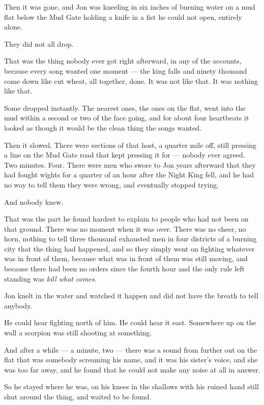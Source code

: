 Then it was gone, and Jon was kneeling in six inches of burning water on a mud flat below the Mud Gate holding a knife in a fist he could not open, entirely alone.

\sceneBreak

They did not all drop.

That was the thing nobody ever got right afterward, in any of the accounts, because every song wanted one moment — the king falls and ninety thousand come down like cut wheat, all together, done. It was not like that. It was nothing like that.

Some dropped instantly. The nearest ones, the ones on the flat, went into the mud within a second or two of the face going, and for about four heartbeats it looked as though it would be the clean thing the songs wanted.

Then it slowed. There were sections of that host, a quarter mile off, still pressing a line on the Mud Gate road that kept pressing it for — nobody ever agreed. Two minutes. Four. There were men who swore to Jon years afterward that they had fought wights for a quarter of an hour after the Night King fell, and he had no way to tell them they were wrong, and eventually stopped trying.

And nobody knew.

That was the part he found hardest to explain to people who had not been on that ground. There was no moment when it was over. There was no cheer, no horn, nothing to tell three thousand exhausted men in four districts of a burning city that the thing had happened, and so they simply went on fighting whatever was in front of them, because what was in front of them was still moving, and because there had been no orders since the fourth hour and the only rule left standing was \textit{kill what comes}.

Jon knelt in the water and watched it happen and did not have the breath to tell anybody.

He could hear fighting north of him. He could hear it east. Somewhere up on the wall a scorpion was still shooting at something.

And after a while — a minute, two — there was a sound from further out on the flat that was somebody screaming his name, and it was his sister’s voice, and she was too far away, and he found that he could not make any noise at all in answer.

So he stayed where he was, on his knees in the shallows with his ruined hand still shut around the thing, and waited to be found.